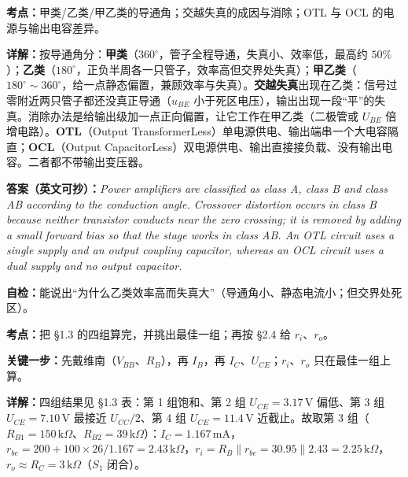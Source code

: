 \documentclass[11pt]{ctexart}
\let\origsubhdr\subhdr
\renewcommand{\subhdr}[1]{\needspace{3\baselineskip}\origsubhdr{#1}}
\begin{document}


\textbf{考点：}甲类/乙类/甲乙类的导通角；交越失真的成因与消除；OTL 与 OCL 的电源与输出电容差异。

\textbf{详解：}按导通角分：\textbf{甲类}（$360^\circ$，管子全程导通，失真小、效率低，最高约 $50\%$）；\textbf{乙类}（$180^\circ$，正负半周各一只管子，效率高但交界处失真）；\textbf{甲乙类}（$180^\circ\sim360^\circ$，给一点静态偏置，兼顾效率与失真）。\textbf{交越失真}出现在乙类：信号过零附近两只管子都还没真正导通（$u_{BE}$ 小于死区电压），输出出现一段“平”的失真。消除办法是给输出级加一点正向偏置，让它工作在甲乙类（二极管或 $U_{BE}$ 倍增电路）。\textbf{OTL}（Output TransformerLess）单电源供电、输出端串一个大电容隔直；\textbf{OCL}（Output CapacitorLess）双电源供电、输出直接接负载、没有输出电容。二者都不带输出变压器。

\textbf{答案（英文可抄）：}\textit{Power amplifiers are classified as class A, class B and class AB according to the conduction angle. Crossover distortion occurs in class B because neither transistor conducts near the zero crossing; it is removed by adding a small forward bias so that the stage works in class AB. An OTL circuit uses a single supply and an output coupling capacitor, whereas an OCL circuit uses a dual supply and no output capacitor.}

\textbf{自检：}能说出“为什么乙类效率高而失真大”（导通角小、静态电流小；但交界处死区）。



\textbf{考点：}把 §1.3 的四组算完，并挑出最佳一组；再按 §2.4 给 $r_i$、$r_o$。

\textbf{关键一步：}先戴维南（$V_{BB}$、$R_B$），再 $I_B$，再 $I_C$、$U_{CE}$；$r_i$、$r_o$ 只在最佳一组上算。

\textbf{详解：}四组结果见 §1.3 表：第 1 组饱和、第 2 组 $U_{CE}=3.17\,\mathrm{V}$ 偏低、第 3 组 $U_{CE}=7.10\,\mathrm{V}$ 最接近 $U_{CC}/2$、第 4 组 $U_{CE}=11.4\,\mathrm{V}$ 近截止。故取第 3 组（$R_{B1}=150\,\mathrm{k}\Omega$、$R_{B2}=39\,\mathrm{k}\Omega$）：$I_C=1.167\,\mathrm{mA}$，$r_{be}=200+100\times26/1.167=2.43\,\mathrm{k}\Omega$，$r_i=R_B\parallel r_{be}=30.95\parallel2.43=2.25\,\mathrm{k}\Omega$，$r_o\approx R_C=3\,\mathrm{k}\Omega$（$S_1$ 闭合）。
\end{document}
